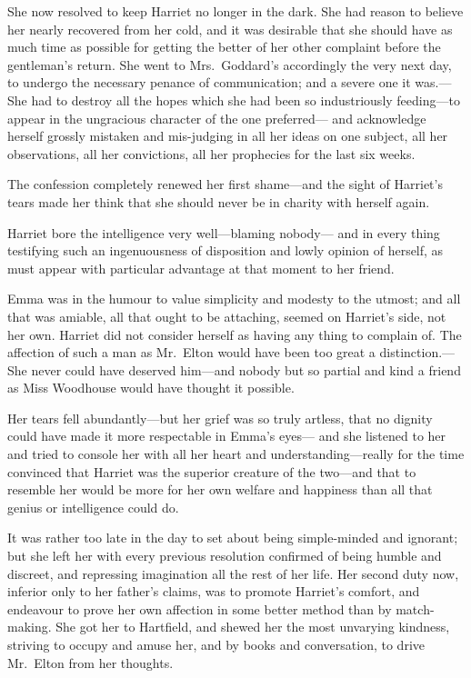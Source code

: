 She now resolved to keep Harriet no longer in the dark.  She had
reason to believe her nearly recovered from her cold, and it was
desirable that she should have as much time as possible for getting
the better of her other complaint before the gentleman's return.
She went to Mrs.\ Goddard's accordingly the very next day, to undergo
the necessary penance of communication; and a severe one it was.---%
She had to destroy all the hopes which she had been so industriously
feeding---to appear in the ungracious character of the one preferred---%
and acknowledge herself grossly mistaken and mis-judging in all her
ideas on one subject, all her observations, all her convictions,
all her prophecies for the last six weeks.

The confession completely renewed her first shame---and the sight
of Harriet's tears made her think that she should never be in charity
with herself again.

Harriet bore the intelligence very well---blaming nobody---%
and in every thing testifying such an ingenuousness of disposition
and lowly opinion of herself, as must appear with particular
advantage at that moment to her friend.

Emma was in the humour to value simplicity and modesty to the utmost;
and all that was amiable, all that ought to be attaching,
seemed on Harriet's side, not her own.  Harriet did not consider
herself as having any thing to complain of.  The affection of such
a man as Mr.\ Elton would have been too great a distinction.---%
She never could have deserved him---and nobody but so partial
and kind a friend as Miss Woodhouse would have thought it possible.

Her tears fell abundantly---but her grief was so truly artless,
that no dignity could have made it more respectable in Emma's eyes---%
and she listened to her and tried to console her with all her heart
and understanding---really for the time convinced that Harriet was
the superior creature of the two---and that to resemble her would
be more for her own welfare and happiness than all that genius or
intelligence could do.

It was rather too late in the day to set about being simple-minded
and ignorant; but she left her with every previous resolution
confirmed of being humble and discreet, and repressing imagination
all the rest of her life.  Her second duty now, inferior only to her
father's claims, was to promote Harriet's comfort, and endeavour
to prove her own affection in some better method than by match-making.
She got her to Hartfield, and shewed her the most unvarying kindness,
striving to occupy and amuse her, and by books and conversation,
to drive Mr.\ Elton from her thoughts.

